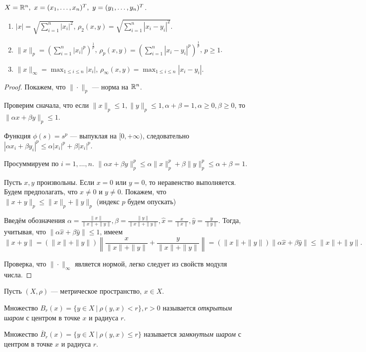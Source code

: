 \begin{example}
    $X = \mathbb{R}^n, \ x = (x_1, \ldots, x_n)^T, \ y = (y_1, \ldots, y_n)^T$.

    \begin{enumerate}
        \item $|x| = \sqrt{\sum_{i = 1}^n |x_i|^2}$, $\rho_2(x, y) = \sqrt{\sum_{i = 1}^n |x_i - y_i|^2}$.
        \item $\|x\|_p = \left(\sum_{i = 1}^n |x_i|^p\right)^{\frac{1}{p}}$, $\rho_p(x, y) = \left(\sum_{i = 1}^n |x_i - y_i|^p\right)^{\frac{1}{p}}$, $p \ge 1$.
        \item $\|x\|_\infty = \max_{1 \le i \le n} |x_i|$, $\rho_\infty(x, y) = \max_{1 \le i \le n} |x_i - y_i|$.
    \end{enumerate}

\end{example}

\begin{proof}
    Покажем, что $\|\cdot\|_p$ --- норма на $\mathbb{R}^n$.
    
    Проверим сначала, что если $\|x\|_p \le 1, \|y\|_p \le 1, \alpha + \beta = 1, \alpha \ge 0, \beta \ge 0$, то $\|\alpha x + \beta y\|_p \le 1$.
    
    Функция $\phi(s) = s^p$ --- выпуклая на $[0, +\infty)$, следовательно $|\alpha x_i + \beta y_i|^p \le \alpha |x_i|^p + \beta |x_i|^p$.
    
    Просуммируем по $i = 1, \ldots, n$.
    $\|\alpha x + \beta y \|^p_p \le \alpha \|x\|^p_p + \beta \|y\|^p_p \le \alpha + \beta = 1$.
    
    Пусть $x, y$ произвольны. Если $x = 0$ или $y = 0$, то неравенство выполняется. Будем предполагать, что $x \neq 0$ и $y \neq 0$. Покажем, что $\|x + y\|_p \le \|x\|_p + \|y\|_p$ (индекс $p$ будем опускать)
    
    Введём обозначения $\alpha = \frac{\|x\|}{\|x\| + \|y\|}, \beta = \frac{\|y\|}{\|x\| + \|y\|}, \hat{x} = \frac{x}{\|x\|}, \hat{y} = \frac{y}{\|y\|}$. Тогда, учитывая, что $\|\alpha \hat{x} + \beta \hat{y}\| \le 1$, имеем
    \[
        \|x + y\| = \left(\|x\| + \|y\|\right) \left\|\frac{x}{\|x\| + \|y\|} + \frac{y}{\|x\| + \|y\|}\right\| = \left(\|x\| + \|y\|\right)\|\alpha \hat{x} + \beta \hat{y}\| \le \|x\| + \|y\|.
    \]

    Проверка, что $\|\cdot\|_{\infty}$ является нормой, легко следует из свойств модуля числа.
\end{proof}

\begin{definition}
    Пусть $(X, \rho)$ --- метрическое пространство, $x \in X$.

    Множество $B_r(x) = \{y \in X \ | \ \rho(y, x) < r\}, r > 0$ называется \emph{открытым шаром} с центром в точке $x$ и радиуса $r$.

    Множество $\overline{B}_r(x) = \{y \in X \ | \ \rho(y, x) \le r\}$ называется \emph{замкнутым шаром} с центром в точке $x$ и радиуса $r$.
\end{definition}


